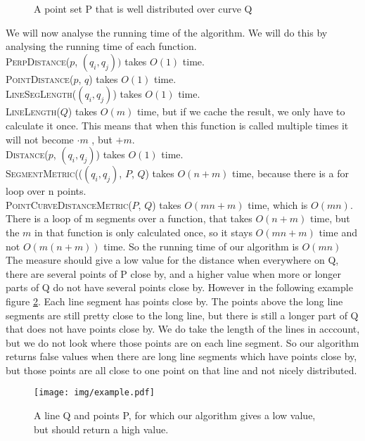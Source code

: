 \documentclass[a4paper,11pt]{article}
\begin{document}
\begin{figure}[H]
	\centering
	\label{fig:line-weight}
	\def\svgwidth{0.5\textwidth}
	
	\caption{A point set P that is well distributed over curve Q}
\end{figure}

 
	
	
We will now analyse the running time of the algorithm. 
We will do this by analysing the running time of each function.\\
\textsc{PerpDistance}($p$, $(q_i, q_j))$ takes $O(1)$ time.\\
\textsc{PointDistance}($p$, $q$) takes $O(1)$ time. \\
\textsc{LineSegLength}($(q_i, q_j)$) takes $O(1)$ time. \\
\textsc{LineLength}($Q$) takes $O(m)$ time, but if we cache the result, we only have to calculate it once. This means that when this function is called multiple times it will not become $\cdot m$ , but $+m$.\\
\textsc{Distance}($p$, $(q_i, q_j)$) takes $O(1)$ time.\\
\textsc{SegmentMetric}(($(q_i, q_j)$, $P$, $Q$) takes $O(n+m)$ time, because there is a for loop over n points. \\
\textsc{PointCurveDistanceMetric}($P$, $Q$)  takes $O(mn + m)$ time, which is $O(mn)$. 
There is a loop of m segments over a function, that takes $O(n+m)$ time, but the $m$ in that function is only calculated once, so it stays $O(mn+m)$ time and not $O(m(n+m))$ time.
So the running time of our algorithm is  $O(mn)$ \\

The measure should give a low value for the distance when everywhere on Q, there are several points of P close by, and a higher value when more or longer parts of Q do not have several points close by.
However in the following example figure \ref{fig:example}. Each line segment has points close by. 
The points above the long line segments are still pretty close to the long line, but there is still a longer part of Q that does not have points close by. 
We do take the length of the lines in acccount, but we do not look where those points are on each line segment. 
So our algorithm returns false values when there are long line segments which have points close by, but those points are all close to one point on that line and not nicely distributed. 
\begin{figure}[H]
	\centering
	\label{fig:example}
	\texttt{[image: img/example.pdf]}
	\caption{A line Q and points P, for which our algorithm gives a low value, but should return a high value.}
\end{figure}
\end{document}
